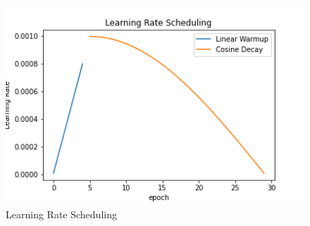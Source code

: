 \documentclass[10pt, conference]{IEEEtran}
\begin{document}
\begin{table}[H]
    \centering
    \caption{MobileNet V2 head for MNIST Dataset
    dataset.}\label{table:MobileNetMNISTHeadArchitecture}
\end{table}

\begin{figure}[H]
    \centering
    \includegraphics[width=0.8\linewidth]{figures/learning_rate_scheduling.png}
    \caption{Learning Rate Scheduling}\label{fig:learning_rate_scheduling}
\end{figure}
\end{document}
